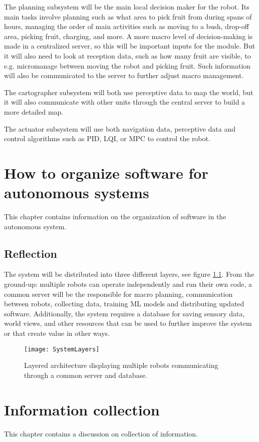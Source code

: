 \documentclass[%
oneside,    %
project,    %
nosummary   %
]{USN-MSc}
\begin{document}
The planning subsystem will be the main local decision maker for the robot. Its main tasks involve planning such as what area to pick fruit from during spans of hours, managing the order of main activities such as moving to a bush, drop-off area, picking fruit, charging, and more. A more macro level of decision-making is made in a centralized server, so this will be important inputs for the module. But it will also need to look at reception data, such as how many fruit are visible, to e.g. micromanage between moving the robot and picking fruit. Such information will also be communicated to the server to further adjust macro management.

The cartographer subsystem will both use perceptive data to map the world, but it will also communicate with other units through the central server to build a more detailed map.

The actuator subsystem will use both navigation data, perceptive data and control algorithms such as PID, LQI, or MPC to control the robot.

\chapter{How to organize software for autonomous systems}
\label{ch:softOrganz}
This chapter contains information on the organization of software in the autonomous system.
\section{Reflection}
The system will be distributed into three different layers, see figure \ref{fig:layers}.
From the ground-up: multiple robots can operate independently and run their own code, a common server will be the responsible for macro planning, communication between robots, collecting data, training ML models and distributing updated software. Additionally, the system requires a database for saving sensory data, world views, and other resources that can be used to further improve the system or that create value in other ways.

\begin{figure}[!ht]
  \centering
  \texttt{[image: SystemLayers]}
  \caption{Layered architecture displaying multiple robots communicating through a common server and database.}
  \label{fig:layers}
\end{figure}

\chapter{Information collection}
\label{ch:infoCol}
This chapter contains a discussion on collection of information.
\end{document}

